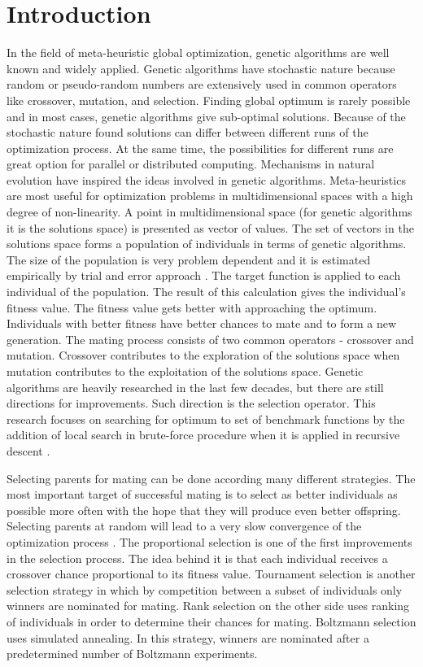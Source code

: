 \documentclass{svproc}
\begin{document}
\section{Introduction}

In the field of meta-heuristic global optimization, genetic algorithms are well known and widely applied. Genetic algorithms have stochastic nature because random or pseudo-random numbers are extensively used in common operators like crossover, mutation, and selection. Finding global optimum is rarely possible and in most cases, genetic algorithms give sub-optimal solutions. Because of the stochastic nature found solutions can differ between different runs of the optimization process. At the same time, the possibilities for different runs are great option for parallel or distributed computing. Mechanisms in natural evolution have inspired the ideas involved in genetic algorithms. Meta-heuristics are most useful for optimization problems in multidimensional spaces with a high degree of non-linearity. A point in multidimensional space (for genetic algorithms it is the solutions space) is presented as vector of values. The set of vectors in the solutions space forms a population of individuals in terms of genetic algorithms. The size of the population is very problem dependent and it is estimated empirically by trial and error approach \cite{alander-01}. The target function is applied to each individual of the population. The result of this calculation gives the individual's fitness value. The fitness value gets better with approaching the optimum. Individuals with better fitness have better chances to mate and to form a new generation. The mating process consists of two common operators - crossover and mutation. Crossover contributes to the exploration of the solutions space when mutation contributes to the exploitation of the solutions space. Genetic algorithms are heavily researched in the last few decades, but there are still directions for improvements. Such direction is the selection operator. This research focuses on searching for optimum to set of benchmark functions by the addition of local search \cite{fellows-01} in brute-force procedure when it is applied in recursive descent \cite{gelfand-01}. 

Selecting parents for mating can be done according many different strategies. The most important target of successful mating is to select as better individuals as possible more often with the hope that they will produce even better offspring. Selecting parents at random will lead to a very slow convergence of the optimization process \cite{wang-01}. The proportional selection \cite{back-01} is one of the first improvements in the selection process. The idea behind it is that each individual receives a crossover chance proportional to its fitness value. Tournament selection \cite{miller-01} is another selection strategy in which by competition between a subset of individuals only winners are nominated for mating. Rank selection \cite{grefenstette-01} on the other side uses ranking of individuals in order to determine their chances for mating. Boltzmann selection \cite{goldberg-01} uses simulated annealing. In this strategy, winners are nominated after a predetermined number of Boltzmann experiments. 
\end{document}
